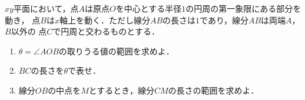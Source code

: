 \documentclass[a4j]{jarticle}
\begin{document}

     \begin{oframed}
     $xy$平面において，点$A$は原点$O$を中心とする半径$1$の円周の第一象限にある部分を動き，
     点$B$は$x$軸上を動く．ただし線分$AB$の長さは$1$であり，線分$AB$は両端$A$，$B$以外の
     点$C$で円周と交わるものとする．
          \begin{enumerate}[(1)]
          \item $\theta=\angle AOB$の取りうる値の範囲を求めよ．
          \item $BC$の長さを$\theta$で表せ．
          \item 線分$OB$の中点を$M$とするとき，線分$CM$の長さの範囲を求めよ．
          \end{enumerate}
     \end{oframed}

\setlength{\columnseprule}{0.4pt}
\end{document}
